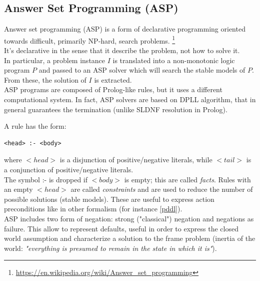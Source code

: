 \documentclass[pdftex,12pt,a4paper]{report}
\begin{document}
\subsection{Answer Set Programming (ASP)}
\noindent Answer set programming (ASP) is a form of declarative programming oriented towards difficult, primarily NP-hard, search problems. \cite{lifschitz2008answer}%
\footnote{\url{https://en.wikipedia.org/wiki/Answer_set_programming}}
\\\noindent It's declarative in the sense that it describe the problem, not how to solve it.
\\\noindent In particular, a problem instance $I$ is translated into a non-monotonic logic program $P$ and passed to an ASP solver which will search the stable models of $P$. From these, the solution of $I$ is extracted.
\\\noindent ASP programs are composed of Prolog-like rules, but it uses a different computational system. In fact, ASP solvers are based on DPLL algorithm, that in general guarantees the termination (unlike SLDNF resolution in Prolog).
\newline

\noindent A rule has the form:
\begin{verbatim}
<head> :- <body>
\end{verbatim}
where $<head>$ is a disjunction of positive/negative literals, while $<tail>$ is a conjunction of positive/negative literals. 
\\\noindent The symbol :- is dropped if $<body>$ is empty; this are called \textit{facts}. Rules with an empty $<head>$ are called \textit{constraints} and are used to reduce the number of possible solutions (stable models). 
These are useful to express action preconditions like in other formalism (for instance \ref{pddl}).
\\\noindent ASP includes two form of negation: strong ("classical") negation and negations as failure. This allow to represent defaults, useful in order to express the closed world assumption and characterize a solution to the frame problem (inertia of the world: \textit{"everything is presumed to remain in the state in which it is"}).
\newline
\end{document}
